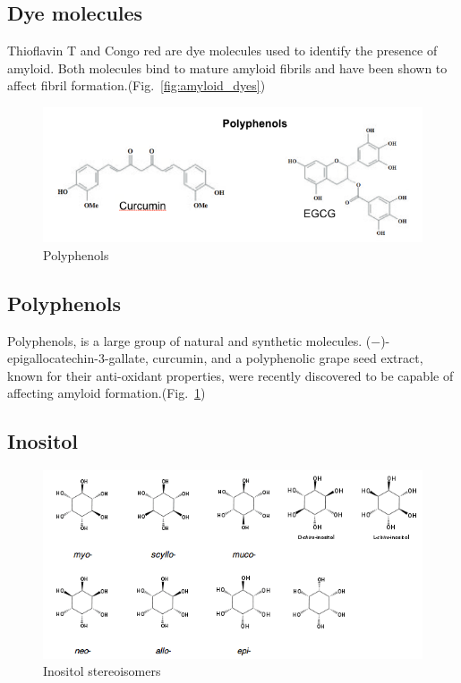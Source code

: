 \subsection{Dye molecules}
Thioflavin T and Congo red are dye molecules used to identify the presence of amyloid.  Both molecules bind to mature amyloid fibrils and have been shown to affect fibril formation.(Fig.~\ref{fig:amyloid_dyes})

\begin{figure}
\centering
\includegraphics[width=6in]{figures/introduction/polyphenols.png}
\caption[Small molecule binders]{Polyphenols}
\label{fig:polyphenols}
\end{figure}

\subsection{Polyphenols}
Polyphenols,  is a large group of natural and synthetic molecules.  (−)-epigallocatechin-3-gallate, curcumin, and a polyphenolic grape seed extract, known for their anti-oxidant properties,  were recently discovered to be capable of affecting amyloid formation.(Fig.~\ref{fig:polyphenols})

\subsection{Inositol}
\begin{figure}
\centering
\includegraphics[width=6in]{figures/introduction/inositol.png}
\caption[Inositol]{Inositol stereoisomers}
\label{fig:inositols}
\end{figure}


